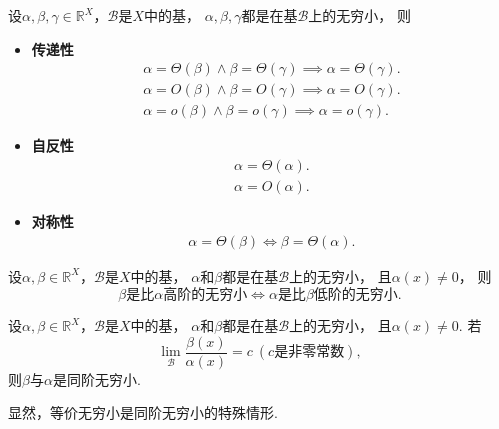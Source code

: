 \begin{proposition}%
设\(\alpha,\beta,\gamma\in\mathbb{R}^X\)，\(\mathcal{B}\)是\(X\)中的基，
\(\alpha,\beta,\gamma\)都是在基\(\mathcal{B}\)上的无穷小，
则\begin{itemize}
	\item {\rm\bf 传递性}\begin{gather*}
		\alpha = \Theta(\beta)
		\land
		\beta = \Theta(\gamma)
		\implies
		\alpha = \Theta(\gamma). \\
		\alpha = O(\beta)
		\land
		\beta = O(\gamma)
		\implies
		\alpha = O(\gamma). \\
		\alpha = o(\beta)
		\land
		\beta = o(\gamma)
		\implies
		\alpha = o(\gamma).
	\end{gather*}

	\item {\rm\bf 自反性}\begin{gather*}
		\alpha = \Theta(\alpha). \\
		\alpha = O(\alpha).
	\end{gather*}

	\item {\rm\bf 对称性}\begin{gather*}
		\alpha = \Theta(\beta)
		\iff
		\beta = \Theta(\alpha).
	\end{gather*}
\end{itemize}
\end{proposition}

\begin{proposition}
设\(\alpha,\beta\in\mathbb{R}^X\)，\(\mathcal{B}\)是\(X\)中的基，
\(\alpha\)和\(\beta\)都是在基\(\mathcal{B}\)上的无穷小，
且\(\alpha(x)\neq0\)，
则\[
	\text{\(\beta\)是比\(\alpha\)高阶的无穷小}
	\iff
	\text{\(\alpha\)是比\(\beta\)低阶的无穷小}.
\]
\end{proposition}

\begin{proposition}
设\(\alpha,\beta\in\mathbb{R}^X\)，\(\mathcal{B}\)是\(X\)中的基，
\(\alpha\)和\(\beta\)都是在基\(\mathcal{B}\)上的无穷小，
且\(\alpha(x)\neq0\).
若\[
	\lim_\mathcal{B} \frac{\beta(x)}{\alpha(x)} = c\ (\text{$c$是非零常数}),
\]
则\(\beta\)与\(\alpha\)是同阶无穷小.
\end{proposition}

\begin{remark}
显然，等价无穷小是同阶无穷小的特殊情形.
\end{remark}

